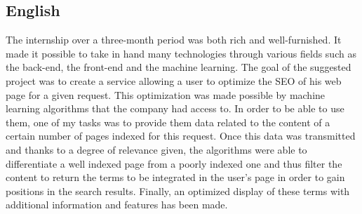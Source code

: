\documentclass[12pt]{article}
\begin{document}
\subsection{English}

The internship over a three-month period was both rich and well-furnished. It made it possible to take in hand many technologies through various fields such as the back-end, the front-end and the machine learning. The goal of the suggested project was to create a service allowing a user to optimize the SEO of his web page for a given request. This optimization was made possible by machine learning algorithms that the company had access to. In order to be able to use them, one of my tasks was to provide them data related to the content of a certain number of pages indexed for this request. Once this data was transmitted and thanks to a degree of relevance given, the algorithms were able to differentiate a well indexed page from a poorly indexed one and thus filter the content to return the terms to be integrated in the user's page in order to gain positions in the search results. Finally, an optimized display of these terms with additional information and features has been made.


\newpage
\end{document}
